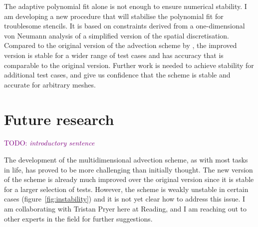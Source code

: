 \documentclass[a4paper,11pt]{article}
\newcommand{\TODO}[1]{\textcolor{purple}{TODO: \emph{#1}}}
\begin{document}
The adaptive polynomial fit alone is not enough to ensure numerical stability.  I am developing a new procedure that will stabilise the polynomial fit for troublesome stencils.  It is based on constraints derived from a one-dimensional von Neumann analysis of a simplified version of the spatial discretisation.  Compared to the original version of the advection scheme by \citet{weller-shahrokhi2014}, the improved version is stable for a wider range of test cases and has accuracy that is comparable to the original version.  Further work is needed to achieve stability for additional test cases, and give us confidence that the scheme is stable and accurate for arbitrary meshes.


\section{Future research}
\TODO{introductory sentence}

The development of the multidimensional advection scheme, as with most tasks in life, has proved to be more challenging than initially thought.  The new version of the scheme is already much improved over the original version since it is stable for a larger selection of tests.  However, the scheme is weakly unstable in certain cases (figure~\ref{fig:instability}) and it is not yet clear how to address this issue.  I am collaborating with Tristan Pryer here at Reading, and I am reaching out to other experts in the field for further suggestions.
\end{document}
